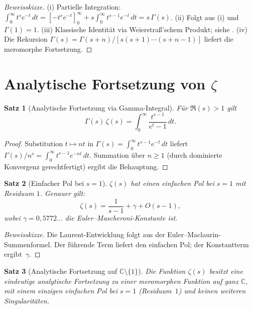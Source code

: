 \documentclass[12pt,a4paper]{amsart}
\newtheorem{theorem}{Satz}[section]
\theoremstyle{definition}
\newcommand{\C}{\mathbb{C}}
\begin{document}
\begin{proof}[Beweisskizze]
(i) Partielle Integration: $\int_0^\infty t^s e^{-t}\,dt
= [-t^s e^{-t}]_0^\infty + s\int_0^\infty t^{s-1}e^{-t}\,dt = s\,\Gamma(s)$.
(ii) Folgt aus (i) und $\Gamma(1) = 1$.
(iii) Klassische Identit\"at via Weierstra\ss'schem Produkt; siehe \cite{Ahlfors1979}.
(iv) Die Rekursion $\Gamma(s) = \Gamma(s+n)/[s(s+1)\cdots(s+n-1)]$ liefert
die meromorphe Fortsetzung.
\end{proof}

\section{Analytische Fortsetzung von \texorpdfstring{$\zeta$}{zeta}}

\begin{theorem}[Analytische Fortsetzung via Gamma-Integral]
\label{thm:continuation}
F\"ur $\Re(s) > 1$ gilt
\[
  \Gamma(s)\,\zeta(s) = \int_0^{\infty} \frac{t^{s-1}}{e^t - 1}\,dt.
\]
\end{theorem}

\begin{proof}
Substitution $t \mapsto nt$ in $\Gamma(s) = \int_0^\infty t^{s-1}e^{-t}\,dt$
liefert $\Gamma(s)/n^s = \int_0^\infty t^{s-1}e^{-nt}\,dt$.
Summation \"uber $n \ge 1$ (durch dominierte Konvergenz gerechtfertigt)
ergibt die Behauptung.
\end{proof}

\begin{theorem}[Einfacher Pol bei $s=1$]
\label{thm:pole}
$\zeta(s)$ hat einen einfachen Pol bei $s = 1$ mit Residuum $1$.
Genauer gilt:
\[
  \zeta(s) = \frac{1}{s-1} + \gamma + O(s-1),
\]
wobei $\gamma = 0{,}5772\ldots$ die Euler--Mascheroni-Konstante ist.
\end{theorem}

\begin{proof}[Beweisskizze]
Die Laurent-Entwicklung folgt aus der Euler--Maclaurin-Summenformel.
Der f\"uhrende Term liefert den einfachen Pol; der Konstantterm ergibt~$\gamma$.
\end{proof}

\begin{theorem}[Analytische Fortsetzung auf $\C \setminus \{1\}$]
\label{thm:full_continuation}
Die Funktion $\zeta(s)$ besitzt eine eindeutige analytische Fortsetzung
zu einer meromorphen Funktion auf ganz $\C$, mit einem einzigen einfachen
Pol bei $s = 1$ (Residuum~$1$) und keinen weiteren Singularit\"aten.
\end{theorem}
\end{document}
